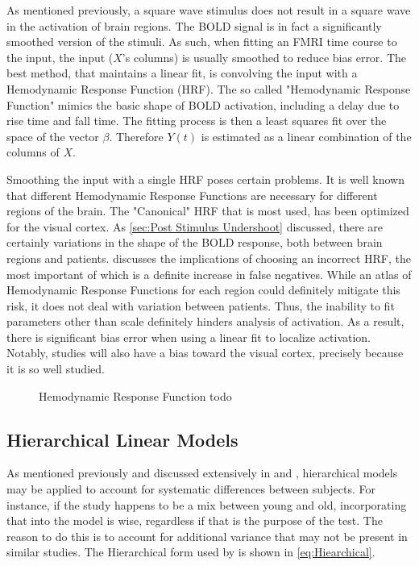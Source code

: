As mentioned previously, a square wave stimulus 
does not result in a square wave in the activation of brain regions. 
The BOLD signal is in fact a significantly smoothed version of the 
stimuli. As such, when fitting an FMRI time course to the input,
the input ($X$'s columns) is usually smoothed to reduce bias error. 
The best method, that maintains a linear fit, is convolving the input 
with a Hemodynamic 
Response Function (HRF). The so called "Hemodynamic Response Function"
mimics the basic shape of BOLD activation, including a delay
due to rise time and fall time. The fitting 
process is then a least squares fit over the space of the vector $\beta$. 
Therefore $Y(t)$ is estimated as a linear combination 
of the columns of $X$. 

Smoothing the input with a single HRF poses certain problems.
It is well known that different Hemodynamic Response Functions are necessary 
for different regions of the brain. The "Canonical" HRF that is most used, 
has been optimized for the visual cortex. As \autoref{sec:Post Stimulus Undershoot}
discussed, there are certainly variations in the shape of the
BOLD response, both between brain regions and patients.  \cite{Handwerker2004}
discusses the implications of choosing an incorrect HRF, the most important
of which is a definite increase in false negatives. While an atlas
of Hemodynamic Response Functions for each region could definitely 
mitigate this risk, it does not deal with variation between patients.
Thus, the inability to fit parameters other than scale definitely hinders 
analysis of activation. As a result, there is significant bias error
when using a linear fit to localize activation. Notably, studies
will also have a bias toward the visual cortex, precisely because
it is so well studied.

\begin{figure}
\caption{Hemodynamic Response Function todo}
\label{fig:HRF}
\end{figure}

\subsection{Hierarchical Linear Models}
As mentioned previously and discussed extensively
in \cite{Friston2002} and \cite{Hoffman1997}, hierarchical models may be 
applied to account for systematic differences between subjects. For instance, if the
study happens to be a mix between young and old, incorporating
that into the model is wise, regardless if that is the purpose of the test. 
The reason to do this is to account for additional variance that may not
be present in similar studies. The Hierarchical form used by
\cite{Friston2002} is shown in \autoref{eq:Hiearchical}.

